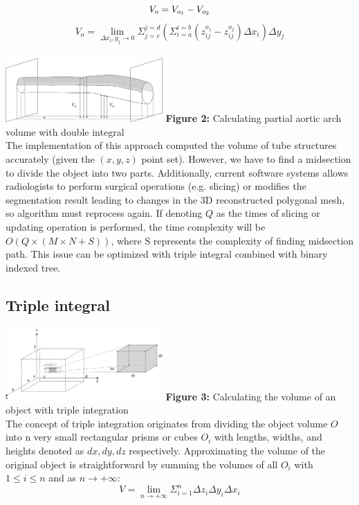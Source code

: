 \documentclass[11pt]{article}
\begin{document}
\begin{multicols}{2}
$$
V_o = V_{o_1} - V_{o_2} \\
$$
$$
V_o = \lim_{\Delta x_i, y_j \rightarrow 0} \Sigma_{j=c}^{j=d} (\Sigma_{i=a}^{i=b} (z^{o_1}_{ij} - z^{o_2}_{ij}) \Delta x_i) \Delta y_j
$$ \\

\includegraphics[width=0.45\textwidth]{Figures/Exclusion.png}
\textbf{Figure 2:} Calculating partial aortic arch volume with double integral \\

The implementation of this approach computed the volume of tube structures accurately (given the $(x,y,z)$ point set). However, we have to find a midsection to divide the object into two parts. Additionally, current software systems \cite{vascular} allows radiologists to perform surgical operations (e.g. slicing) or modifies the segmentation result leading to changes in the 3D reconstructed polygonal mesh, so algorithm must reprocess again. If denoting $Q$ as the times of slicing or updating operation is performed, the time complexity will be $O (Q \times (M \times N + S))$, where S represents the complexity of finding midsection path. This issue can be optimized with triple integral combined with binary indexed tree.

\subsection{Triple integral}
\includegraphics[width=0.45\textwidth]{Figures/Triple Integral.png}
\textbf{Figure 3:} Calculating the volume of an object with triple integration  \\

The concept of triple integration originates from dividing the object volume $O$ into n very small rectangular prisms or cubes $O_i$ with lengths, widths, and heights denoted as $dx,dy,dz$ respectively. Approximating the volume of the original object is straightforward by summing the volumes of all $O_i$ with $1 \leq i \leq n$ and as $n \rightarrow +\infty$:
$$
V = \lim_{n \rightarrow + \infty} \Sigma_{i=1}^{n} \Delta z_i \Delta y_i \Delta x_i
$$


\end{multicols}
\end{document}
